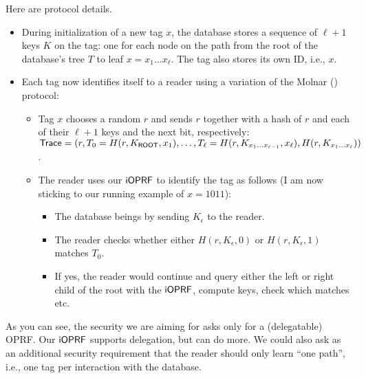 Here are protocol details.
\begin{itemize}
  
\item During initialization of a new tag $x$, the database stores a
  sequence of $\ell+1$ keys $K$ on the tag: one for each node on the
  path from the root of the database's tree $T$ to leaf
  $x=x_1\ldots{}x_\ell$. The tag also stores its own ID, i.e., $x$.

\item Each tag now identifies itself to a reader using a variation of
  the Molnar () protocol:

  \begin{itemize}
  \item Tag $x$ chooses a random $r$ and sends $r$ together with a
    hash of $r$ and each of their $\ell+1$ keys and the next bit,
    respectively:
    $\mathsf{Trace}=(r,T_0=H(r,
    K_{\mathsf{ROOT}},x_1),\ldots,T_\ell=H(r,K_{x_1\ldots{}x_{\ell-1}},x_{\ell}),H(r,K_{x_1\ldots{}x_\ell}))$.

\item The reader uses our $\mathsf{i}\mathsf{OPRF}$ to identify the tag as follows (I am now sticking to our running example of $x=1011$):

 \begin{itemize}

 \item The database beings by sending $K_\epsilon$ to the reader.
   
  \item The reader checks whether either $H(r,K_\epsilon,0)$ or $H(r,K_\epsilon,1)$  matches
    $T_0$.

  \item If yes, the reader would continue and query either the left or
    right child of the root with the $\mathsf{i}\mathsf{OPRF}$, compute keys, check
    which matches etc.
\end{itemize}
  \end{itemize}
\end{itemize}

As you can see, the security we are aiming for asks only for a
(delegatable) OPRF. Our $\mathsf{i}\mathsf{OPRF}$ supports delegation, but can do more. We
could also ask as an additional security requirement that the reader
should only learn ``one path'', i.e., one tag per interaction with the
database. 


